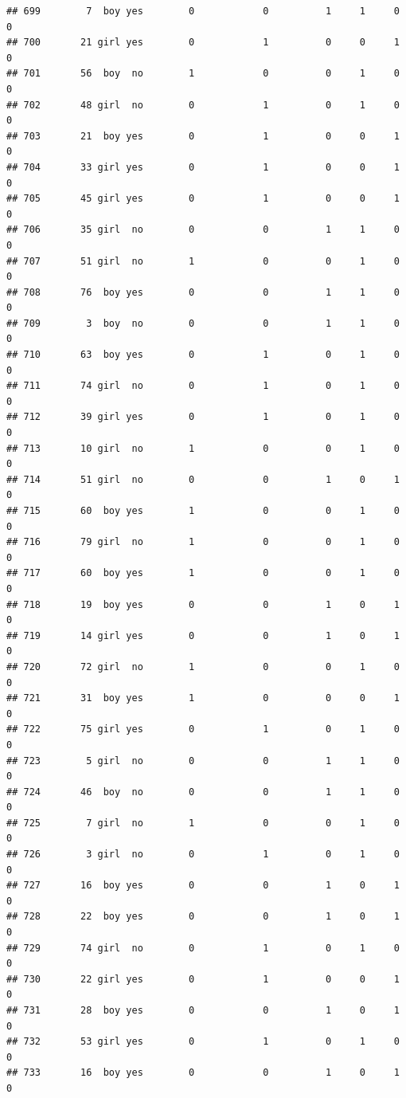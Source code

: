 \documentclass[man]{apa6}
\begin{document}
\begin{verbatim}
## 699        7  boy yes        0            0          1     1     0     0
## 700       21 girl yes        0            1          0     0     1     0
## 701       56  boy  no        1            0          0     1     0     0
## 702       48 girl  no        0            1          0     1     0     0
## 703       21  boy yes        0            1          0     0     1     0
## 704       33 girl yes        0            1          0     0     1     0
## 705       45 girl yes        0            1          0     0     1     0
## 706       35 girl  no        0            0          1     1     0     0
## 707       51 girl  no        1            0          0     1     0     0
## 708       76  boy yes        0            0          1     1     0     0
## 709        3  boy  no        0            0          1     1     0     0
## 710       63  boy yes        0            1          0     1     0     0
## 711       74 girl  no        0            1          0     1     0     0
## 712       39 girl yes        0            1          0     1     0     0
## 713       10 girl  no        1            0          0     1     0     0
## 714       51 girl  no        0            0          1     0     1     0
## 715       60  boy yes        1            0          0     1     0     0
## 716       79 girl  no        1            0          0     1     0     0
## 717       60  boy yes        1            0          0     1     0     0
## 718       19  boy yes        0            0          1     0     1     0
## 719       14 girl yes        0            0          1     0     1     0
## 720       72 girl  no        1            0          0     1     0     0
## 721       31  boy yes        1            0          0     0     1     0
## 722       75 girl yes        0            1          0     1     0     0
## 723        5 girl  no        0            0          1     1     0     0
## 724       46  boy  no        0            0          1     1     0     0
## 725        7 girl  no        1            0          0     1     0     0
## 726        3 girl  no        0            1          0     1     0     0
## 727       16  boy yes        0            0          1     0     1     0
## 728       22  boy yes        0            0          1     0     1     0
## 729       74 girl  no        0            1          0     1     0     0
## 730       22 girl yes        0            1          0     0     1     0
## 731       28  boy yes        0            0          1     0     1     0
## 732       53 girl yes        0            1          0     1     0     0
## 733       16  boy yes        0            0          1     0     1     0

\end{verbatim}
\end{document}
